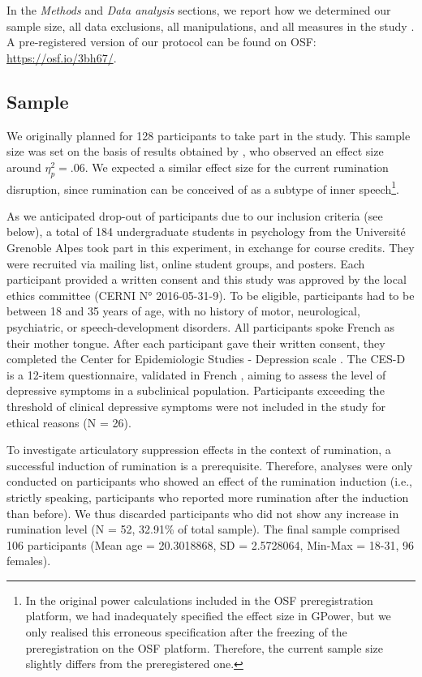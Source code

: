 \documentclass[12pt,]{book}
\let\rmarkdownfootnote\footnote%
\def\footnote{\protect\rmarkdownfootnote}
\theoremstyle{definition}
\theoremstyle{definition}
\theoremstyle{definition}
\theoremstyle{remark}
\begin{document}
In the \emph{Methods} and \emph{Data analysis} sections, we report how
we determined our sample size, all data exclusions, all manipulations,
and all measures in the study \citep{Simmons2012}. A pre-registered
version of our protocol can be found on OSF:
\url{https://osf.io/3bh67/}.

\subsection{Sample}\label{sample}

We originally planned for 128 participants to take part in the study.
This sample size was set on the basis of results obtained by
\citet{Topolinski2009}, who observed an effect size around
\(\eta_{p}^{2}=.06\). We expected a similar effect size for the current
rumination disruption, since rumination can be conceived of as a subtype
of inner speech\footnote{In the original power calculations included in
  the OSF preregistration platform, we had inadequately specified the
  effect size in GPower, but we only realised this erroneous
  specification after the freezing of the preregistration on the OSF
  platform. Therefore, the current sample size slightly differs from the
  preregistered one.}.

As we anticipated drop-out of participants due to our inclusion criteria
(see below), a total of 184 undergraduate students in psychology from
the Université Grenoble Alpes took part in this experiment, in exchange
for course credits. They were recruited via mailing list, online student
groups, and posters. Each participant provided a written consent and
this study was approved by the local ethics committee (CERNI N°
2016-05-31-9). To be eligible, participants had to be between 18 and 35
years of age, with no history of motor, neurological, psychiatric, or
speech-development disorders. All participants spoke French as their
mother tongue. After each participant gave their written consent, they
completed the Center for Epidemiologic Studies - Depression scale
\citep[CES-D;][]{Radloff1977a}. The CES-D is a 12-item questionnaire,
validated in French \citep{Morin2011}, aiming to assess the level of
depressive symptoms in a subclinical population. Participants exceeding
the threshold of clinical depressive symptoms \citep[i.e.,
\textgreater{}23 for females and \textgreater{}17 for
males;][]{Radloff1977a} were not included in the study for ethical
reasons (N = 26).

To investigate articulatory suppression effects in the context of
rumination, a successful induction of rumination is a prerequisite.
Therefore, analyses were only conducted on participants who showed an
effect of the rumination induction (i.e., strictly speaking,
participants who reported more rumination after the induction than
before). We thus discarded participants who did not show any increase in
rumination level (N = 52, 32.91\% of total sample). The final sample
comprised 106 participants (Mean age = 20.3018868, SD = 2.5728064,
Min-Max = 18-31, 96 females).
\end{document}
